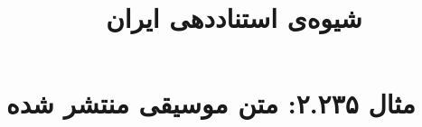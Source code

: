 \documentclass[a4paper,10pt]{article}
\begin{document}
\title{شیوه‌ی استناددهی ایران
 }
\author{}
\date{}
\maketitle



\section*{مثال ۲.۲۳۵: متن موسیقی منتشر شده}

\cite{لاچینی1378}\\
\cite{mozart1960}\\






\end{document}
